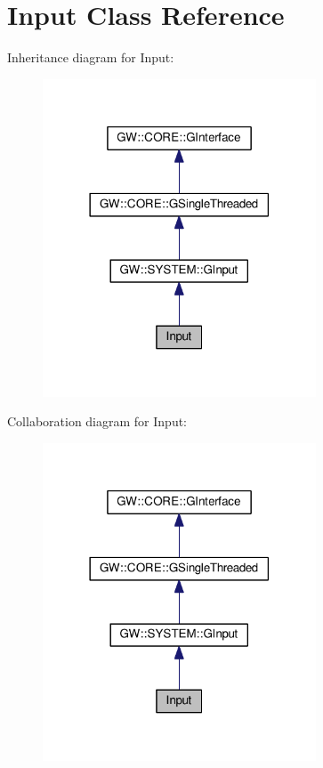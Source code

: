 \hypertarget{classInput}{}\section{Input Class Reference}
\label{classInput}


Inheritance diagram for Input\+:
\nopagebreak
\begin{figure}[H]
\begin{center}
\leavevmode
\includegraphics[width=230pt]{classInput__inherit__graph}
\end{center}
\end{figure}


Collaboration diagram for Input\+:
\nopagebreak
\begin{figure}[H]
\begin{center}
\leavevmode
\includegraphics[width=230pt]{classInput__coll__graph}
\end{center}
\end{figure}
